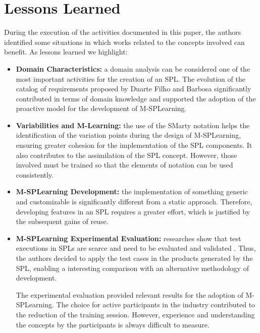 \section{Lessons Learned}\label{section5}

During the execution of the activities documented in this paper, the authors identified some situations in which works related to the concepts involved can benefit. As lessons learned we highlight:

\begin{itemize}
    \item \textbf{Domain Characteristics:} a domain analysis can be considered one of the most important activities for the creation of an SPL. The evolution of the catalog of requirements proposed by Duarte Filho and Barbosa \cite{filho13} significantly contributed in terms of domain knowledge and supported the adoption of the proactive model for the development of M-SPLearning.
    \item \textbf{Variabilities and M-Learning:} the use of the SMarty notation helps the identification of the variation points during the design of M-SPLearning, ensuring greater cohesion for the implementation of the SPL components. It also contributes to the assimilation of the SPL concept. However, those involved must be trained so that the elements of notation can be used consistently.
    \item \textbf{M-SPLearning Development:} the implementation of something generic and customizable is significantly different from a static approach. Therefore, developing features in an SPL requires a greater effort, which is justified by the subsequent gains of reuse.
    \item \textbf{M-SPLearning Experimental Evaluation:} researches show that test executions in SPLs are scarce and need to be evaluated and validated \cite{engstrom11}. Thus, the authors decided to apply the test cases in the products generated by the SPL, enabling a interesting comparison with an alternative methodology of development.
  
    The experimental evaluation provided relevant results for the adoption of M-SPLearning. The choice for active participants in the industry contributed to the reduction of the training session. However, experience and understanding the concepts by the participants is always difficult to measure.
\end{itemize}